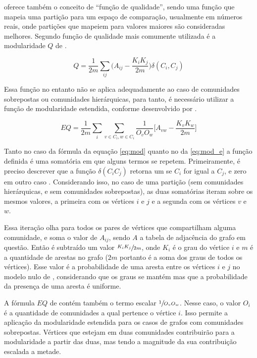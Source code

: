 \documentclass[notes.tex]{subfiles}
\begin{document}
 oferece também o conceito de ``função de qualidade'', sendo uma função que mapeia uma partição para um espaço de comparação, usualmente em números reais, onde partições que mapeiem para valores maiores são consideradas melhores.
Segundo  função de qualidade mais comumente utilizada é a modularidade $Q$ de .

\begin{equation}\label{eq:mod}
    Q = \frac{1}{2m}\sum_{ij}\Bigg(A_{ij}-\frac{K_iK_j}{2m}\Bigg)\delta(C_i, C_j)
\end{equation}

Essa função no entanto não se aplica adequadamente ao caso de comunidades sobrepostas ou comunidades hierárquicas, para tanto, é necessário utilizar a função de modularidade estendida, conforme desenvolvido por .

\begin{equation}\label{eq:mod_e}
    EQ = \frac{1}{2m}\sum_{i}\sum_{v \in C_i, w \in C_i}\frac{1}{O_vO_w}\Bigg[A_{vw} - \frac{K_vK_w}{2m} \Bigg]
\end{equation}

Tanto no caso da fórmula da equação \ref{eq:mod} quanto no da \ref{eq:mod_e} a função definida é uma somatória em que alguns termos se repetem.
Primeiramente, é preciso descrever que a função $\delta(C_iC_j)$ retorna um se $C_i$ for igual a  $C_j$, e zero em outro caso \cite{fortunato2010community}.
Considerando isso, no caso de uma partição (sem comunidades hierárquicas, e sem comunidades sobrepostas), as duas somatórias iteram sobre os mesmos valores, a primeira com os vértices $i$ e $j$ e a segunda com os vértices $v$ e  $w$.

Essa iteração olha para todos os pares de vértices que compartilham alguma comunidade, e soma o valor de $A_{ij}$, sendo $A$ a tabela de adjacência do grafo em questão.
Então é subtraído um valor $\sfrac{K_iK_j}{2m}$, onde  $K_i$ é o grau do vértice $i$ e  $m$ é a quantidade de arestas no grafo ($2m$ portanto é a soma dos graus de todos os vértices).
Esse valor é a probabilidade de uma aresta entre os vértices  $i$ e  $j$ no modelo nulo de , considerando que os graus se mantém mas que a probabilidade da presença de uma aresta é uniforme.

A fórmula $EQ$ de  contém também o termo escalar $\sfrac{1}{O_vO_w}$.
Nesse caso, o valor $O_i$ é a quantidade de comunidades a qual pertence o vértice $i$.
Isso permite a aplicação da modularidade estendida para os casos de grafos com comunidades sobrepostas.
Vértices que estejam em duas comunidades contribuirão para a modularidade a partir das duas, mas tendo a magnitude da sua contribuição escalada a metade.
\end{document}
